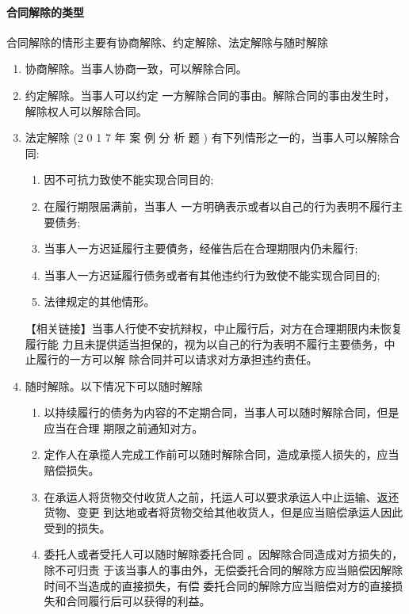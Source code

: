 \documentclass[UTF8,12pt]{ctexart}
\numberwithin{equation}{section} %
\numberwithin{figure}{section}
\numberwithin{table}{section}
\begin{document}
	\paragraph{合同解除的类型}
	合同解除的情形主要有协商解除、约定解除、法定解除与随时解除
	\begin{enumerate}
		\item 协商解除。当事人协商一致，可以解除合同。
		
		\item 约定解除。当事人可以约定 一方解除合同的事由。解除合同的事由发生时，解除权人可以解除合同。 
		
		\item 法定解除 (2 0 1 7 年 案 例 分 析 题 )
		有下列情形之一的，当事人可以解除合同:
		\begin{enumerate}
			\item 因不可抗力致使不能实现合同目的;
			
			\item 在履行期限届满前，当事人 一方明确表示或者以自己的行为表明不履行主要债务; 
			
			\item 当事人一方迟延履行主要債务，经催告后在合理期限内仍未履行;
			
			\item 当事人一方迟延履行债务或者有其他违约行为致使不能实现合同目的;
			
			\item 法律规定的其他情形。
		\end{enumerate}
		【相关链接】当事人行使不安抗辩权，中止履行后，对方在合理期限内未恢复履行能 力且未提供适当担保的，视为以自己的行为表明不履行主要债务，中止履行的一方可以解 除合同并可以请求对方承担违约责任。
		
		\item 随时解除。以下情况下可以随时解除
		\begin{enumerate}
			\item 以持续履行的债务为内容的不定期合同，当事人可以随时解除合同，但是应当在合理 期限之前通知对方。
			
			\item 定作人在承揽人完成工作前可以随时解除合同，造成承揽人损失的，应当赔偿损失。 
			
			\item 在承运人将货物交付收货人之前，托运人可以要求承运人中止运输、返还货物、变更 到达地或者将货物交给其他收货人，但是应当赔偿承运人因此受到的损失。 
			
			\item 委托人或者受托人可以随时解除委托合同 。因解除合同造成对方损失的，除不可归责 于该当事人的事由外，无偿委托合同的解除方应当赔偿因解除时间不当造成的直接损失，有偿 委托合同的解除方应当赔偿对方的直接损失和合同履行后可以获得的利益。
		\end{enumerate} 
	\end{enumerate}
	
\end{document}

